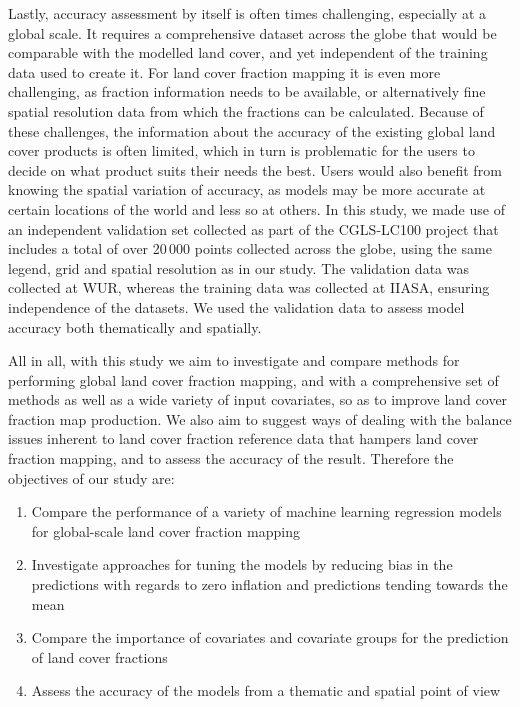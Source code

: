 \documentclass[review,authoryear,3p]{elsarticle}
\begin{document}
Lastly, accuracy assessment by itself is often times challenging, especially at a global scale.
It requires a comprehensive dataset across the globe that would be comparable with the modelled land cover, and yet independent of the training data used to create it.
For land cover fraction mapping it is even more challenging, as fraction information needs to be available, or alternatively fine spatial resolution data from which the fractions can be calculated.
Because of these challenges, the information about the accuracy of the existing global land cover products is often limited, which in turn is problematic for the users to decide on what product suits their needs the best.
Users would also benefit from knowing the spatial variation of accuracy, as models may be more accurate at certain locations of the world and less so at others.
In this study, we made use of an independent validation set collected as part of the \gls{CGLS-LC100} project \citep{nandin-erdene_tsendbazar_copernicus_2019} that includes a total of over 20\,000 points collected across the globe, using the same legend, grid and spatial resolution as in our study.
The validation data was collected at \gls{WUR}, whereas the training data was collected at \gls{IIASA}, ensuring independence of the datasets.
We used the validation data to assess model accuracy both thematically and spatially.

All in all, with this study we aim to investigate and compare methods for performing global land cover fraction mapping, and with a comprehensive set of methods as well as a wide variety of input covariates, so as to improve land cover fraction map production.
We also aim to suggest ways of dealing with the balance issues inherent to land cover fraction reference data that hampers land cover fraction mapping, and to assess the accuracy of the result.
Therefore the objectives of our study are:

\begin{enumerate}
 \item Compare the performance of a variety of machine learning regression models for global-scale land cover fraction mapping
 \item Investigate approaches for tuning the models by reducing bias in the predictions with regards to zero inflation and predictions tending towards the mean
 \item Compare the importance of covariates and covariate groups for the prediction of land cover fractions
 \item Assess the accuracy of the models from a thematic and spatial point of view
\end{enumerate}
\end{document}

